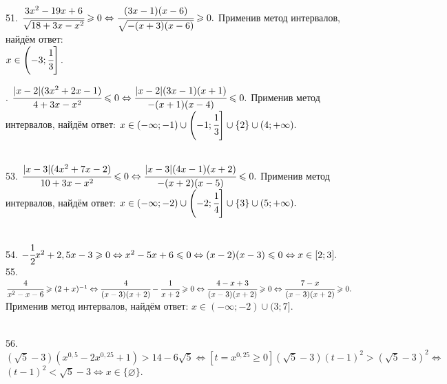 51. $\cfrac{3x^2-19x+6}{\sqrt{18+3x-x^2}}\geqslant0\Leftrightarrow\cfrac{(3x-1)(x-6)}{\sqrt{-(x+3)(x-6)}}\geqslant0.$ Применив метод интервалов, найдём ответ:\\ $x\in\left(-3;\cfrac{1}{3}\right].$
\begin{figure}[ht!]
\end{figure}\newpage{}. $\cfrac{|x-2|(3x^2+2x-1)}{4+3x-x^2}\leqslant0\Leftrightarrow\cfrac{|x-2|(3x-1)(x+1)}{-(x+1)(x-4)}\leqslant0.$ Применив метод интервалов, найдём ответ: $x\in(-\infty;-1)\cup\left(-1;\cfrac{1}{3}\right]\cup\{2\}\cup(4;+\infty).$
\begin{figure}[ht!]
\end{figure}\\
53. $\cfrac{|x-3|(4x^2+7x-2)}{10+3x-x^2}\leqslant0\Leftrightarrow\cfrac{|x-3|(4x-1)(x+2)}{-(x+2)(x-5)}\leqslant0.$ Применив метод интервалов, найдём ответ: $x\in(-\infty;-2)\cup\left(-2;\cfrac{1}{4}\right]\cup\{3\}\cup(5;+\infty).$
\begin{figure}[ht!]
\end{figure}\\
54. $-\cfrac{1}{2}x^2+2,5x-3\geqslant0\Leftrightarrow x^2-5x+6\leqslant0\Leftrightarrow (x-2)(x-3)\leqslant0\Leftrightarrow x\in[2;3].$\\
55. $\cfrac{4}{x^2-x-6}\geqslant(2+x)^{-1}\Leftrightarrow\cfrac{4}{(x-3)(x+2)}-\cfrac{1}{x+2}\geqslant0\Leftrightarrow\cfrac{4-x+3}{(x-3)(x+2)}\geqslant0
\Leftrightarrow\cfrac{7-x}{(x-3)(x+2)}\geqslant0.$ Применив метод интервалов, найдём ответ: $x\in(-\infty;-2)\cup(3;7].$
\begin{figure}[ht!]
\end{figure}\\
56. $(\sqrt{5}-3)(x^{0,5}-2x^{0,25}+1)>14-6\sqrt{5}\Leftrightarrow[t=x^{0,25}\geqslant0](\sqrt{5}-3)(t-1)^2>(\sqrt{5}-3)^2\Leftrightarrow$\\$ (t-1)^2<\sqrt{5}-3
\Leftrightarrow x\in\{\varnothing\}.$\\
